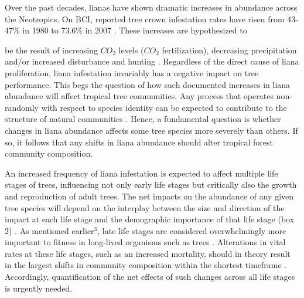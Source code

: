 \documentclass[b5paper,justified]{tufte-book} %
\begin{document}
Over the past decades, lianas have shown dramatic increases in abundance across the Neotropics. On BCI, reported tree crown infestation rates have risen from 43-47\% in 1980  \citep{Putz1984} to 73.6\% in 2007 \citep{Ingwell2010}.  These increases are hypothesized to \begin{fullwidth} be the result of increasing $CO_2$ levels ($CO_2$ fertilization), decreasing precipitation \citep{Schnitzer2011} and/or increased disturbance and hunting \citep{Marvin2015, Wright2015}. Regardless of the direct cause of liana proliferation, liana infestation invariably has a negative impact on tree performance. This begs the question of how such documented increases in liana abundance will affect tropical tree communities. Any process that operates non-randomly with respect to species identity can be expected to contribute to the structure of natural communities \citep{Chase2003, Vellend2010}. Hence, a fundamental question is whether changes in liana abundance affects some tree species more severely than others. If so, it follows that any shifts in liana abundance should alter tropical forest community composition.  

An increased frequency of liana infestation is expected to affect multiple life stages of trees, influencing not only early life stages \citep{Schnitzer2000} but critically also the growth and reproduction of adult trees. The net impacts on the abundance of any given tree species will depend on the interplay between the size and direction of the impact at each life stage and the demographic importance of that life stage (box 2) \citep{Zuidema2001}. As mentioned earlier$^3$,  late life stages are considered overwhelmingly more important to fitness in long-lived organisms such as trees \citep{DeKroon2000, Franco2004, Visser2011}. Alterations in vital rates at these life stages, such as an increased mortality, should in theory result in the largest shifts in community composition within the shortest timeframe \citep[e.g.][]{Caswell2001}. Accordingly, quantification of the net effects of such changes across all life stages is urgently needed. 


\end{fullwidth}
\end{document}
